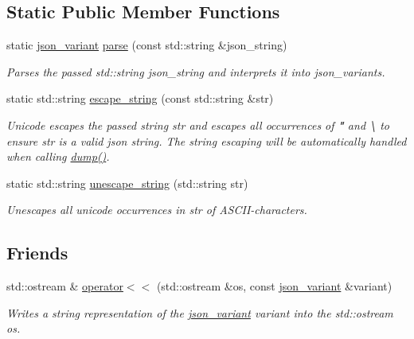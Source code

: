 \subsection*{Static Public Member Functions}
\begin{DoxyCompactItemize}
\item 
static \hyperlink{classJSONLIB__NAMESPACE_1_1json__variant}{json\+\_\+variant} \hyperlink{classJSONLIB__NAMESPACE_1_1json__variant_ae9198f05ef46e3ada2a10d942e8478d0}{parse} (const std\+::string \&json\+\_\+string)
\begin{DoxyCompactList}\small\item\em Parses the passed std\+::string {\ttfamily json\+\_\+string} and interprets it into json\+\_\+variants. \end{DoxyCompactList}\item 
static std\+::string \hyperlink{classJSONLIB__NAMESPACE_1_1json__variant_a4c2354098f97b91b5a07dbda981673cf}{escape\+\_\+string} (const std\+::string \&str)
\begin{DoxyCompactList}\small\item\em Unicode escapes the passed string {\ttfamily str} and escapes all occurrences of {\bfseries "} and {\bfseries \textbackslash{}} to ensure {\ttfamily str} is a valid json string. The string escaping will be automatically handled when calling \hyperlink{classJSONLIB__NAMESPACE_1_1json__variant_a72d4a39d77b76f076354219edc6ea4a0}{dump()}. \end{DoxyCompactList}\item 
static std\+::string \hyperlink{classJSONLIB__NAMESPACE_1_1json__variant_ab3b411443074a97949b5675676d0b136}{unescape\+\_\+string} (std\+::string str)
\begin{DoxyCompactList}\small\item\em Unescapes all unicode occurrences in {\ttfamily str} of A\+S\+C\+I\+I-\/characters. \end{DoxyCompactList}\end{DoxyCompactItemize}
\subsection*{Friends}
\begin{DoxyCompactItemize}
\item 
std\+::ostream \& \hyperlink{classJSONLIB__NAMESPACE_1_1json__variant_a753abbab1ca55cbb0dbb9dc9e95a4983}{operator$<$$<$} (std\+::ostream \&os, const \hyperlink{classJSONLIB__NAMESPACE_1_1json__variant}{json\+\_\+variant} \&variant)
\begin{DoxyCompactList}\small\item\em Writes a string representation of the \hyperlink{classJSONLIB__NAMESPACE_1_1json__variant}{json\+\_\+variant} {\ttfamily variant} into the std\+::ostream {\ttfamily os}. \end{DoxyCompactList}\end{DoxyCompactItemize}


